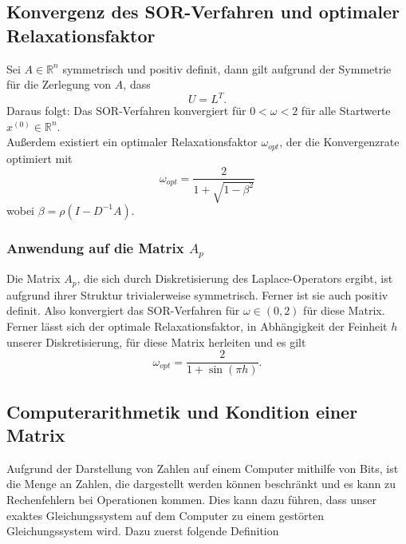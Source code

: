 \documentclass{scrartcl}
\begin{document}
\subsection{Konvergenz des SOR-Verfahren und optimaler Relaxationsfaktor}
\begin{theorem}
    Sei \(A \in \mathbb{R}^n\) symmetrisch und positiv definit, dann gilt aufgrund der Symmetrie
    für die Zerlegung von \(A\), dass
    \[U = L^T.\]
    Daraus folgt: Das SOR-Verfahren konvergiert für \(0 < \omega < 2\) für alle
    Startwerte \(x^{(0)} \in \mathbb{R}^n\). \\
    Außerdem existiert ein optimaler Relaxationsfaktor \(\omega_{opt}\), der die Konvergenzrate optimiert mit
    \[\omega_{opt}=\frac{2}{1+\sqrt{1-\beta^2}}\]
    wobei \(\beta=\rho(I-D^{-1}A)\)\cite[p.~4]{omega_opt}.
\end{theorem}


\subsubsection{Anwendung auf die Matrix \(A_{p}\)}
Die Matrix \(A_p\), die sich durch Diskretisierung des Laplace-Operators ergibt, ist aufgrund ihrer Struktur trivialerweise symmetrisch. Ferner ist sie auch positiv definit\cite[p.~11]{PosDef}.
Also konvergiert das SOR-Verfahren für \(\omega \in (0, 2)\) für diese Matrix.
\\
Ferner lässt sich der optimale Relaxationsfaktor, in Abhängigkeit der Feinheit \(h\) unserer Diskretisierung, für diese Matrix herleiten und es gilt \cite{omega_opt}
\[\omega_{opt}=\frac{2}{1+\sin(\pi h)}.\] 


\subsection{Computerarithmetik und Kondition einer Matrix}
Aufgrund der Darstellung von Zahlen auf einem Computer mithilfe von Bits, ist die Menge an Zahlen, die dargestellt werden können beschränkt und es kann zu Rechenfehlern bei Operationen kommen.
Dies kann dazu führen, dass unser exaktes Gleichungssystem auf dem Computer zu einem gestörten
Gleichungssystem wird.
Dazu zuerst folgende Definition
\end{document}
